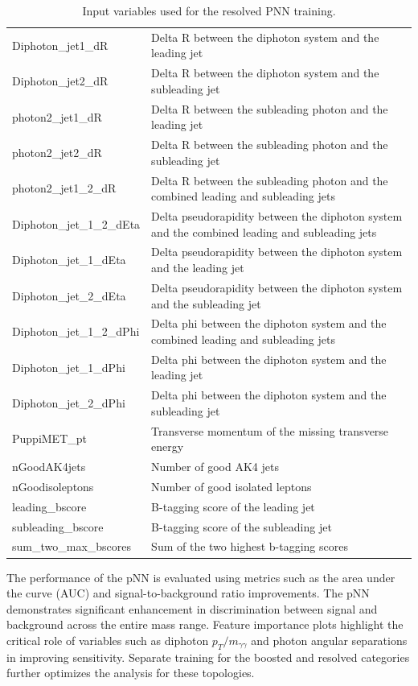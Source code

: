 \begin{table}[htbp!]
\begin{tabularx}{\textwidth}{|l|X|}
    Diphoton\_jet1\_dR & Delta R between the diphoton system and the leading jet \\
    Diphoton\_jet2\_dR & Delta R between the diphoton system and the subleading jet \\
    photon2\_jet1\_dR & Delta R between the subleading photon and the leading jet \\
    photon2\_jet2\_dR & Delta R between the subleading photon and the subleading jet \\
    photon2\_jet1\_2\_dR & Delta R between the subleading photon and the combined leading and subleading jets \\
    Diphoton\_jet\_1\_2\_dEta & Delta pseudorapidity between the diphoton system and the combined leading and subleading jets \\
    Diphoton\_jet\_1\_dEta & Delta pseudorapidity between the diphoton system and the leading jet \\
    Diphoton\_jet\_2\_dEta & Delta pseudorapidity between the diphoton system and the subleading jet \\
    Diphoton\_jet\_1\_2\_dPhi & Delta phi between the diphoton system and the combined leading and subleading jets \\
    Diphoton\_jet\_1\_dPhi & Delta phi between the diphoton system and the leading jet \\
    Diphoton\_jet\_2\_dPhi & Delta phi between the diphoton system and the subleading jet \\
    PuppiMET\_pt & Transverse momentum of the missing transverse energy \\
    nGoodAK4jets & Number of good AK4 jets \\
    nGoodisoleptons & Number of good isolated leptons \\
    leading\_bscore & B-tagging score of the leading jet \\
    subleading\_bscore & B-tagging score of the subleading jet \\
    sum\_two\_max\_bscores & Sum of the two highest b-tagging scores \\

    \hline
    \end{tabularx}
    \caption{Input variables used for the resolved PNN training.}
    \label{tab:inputvariables_resolved}
\end{table}

The performance of the pNN is evaluated using metrics such as the area under the curve (AUC) and signal-to-background ratio improvements. The pNN demonstrates significant enhancement in discrimination between signal and background across the entire mass range. Feature importance plots highlight the critical role of variables such as diphoton \(p_T/m_{\gamma\gamma}\) and photon angular separations in improving sensitivity. Separate training for the boosted and resolved categories further optimizes the analysis for these topologies.

